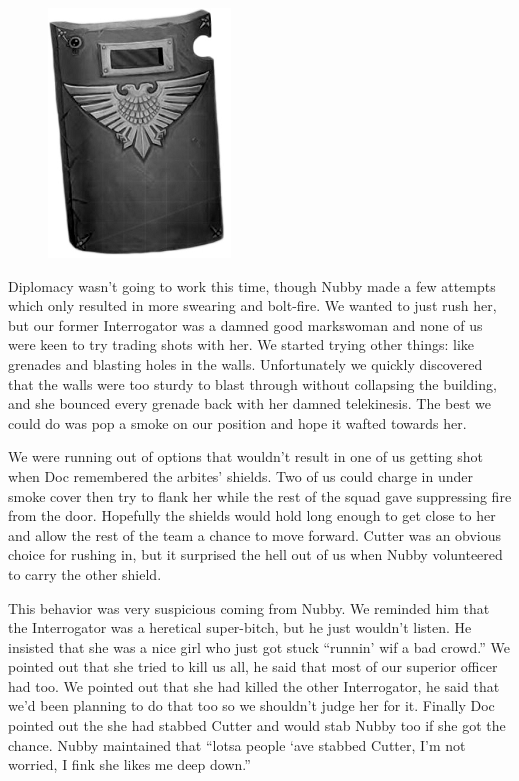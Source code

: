 \begin{figure}
	\begin{center}
		\includegraphics[width=\figwidth]{pics/5/35.png}
	\end{center}
\end{figure}
Diplomacy wasn’t going to work this time, though Nubby made a few attempts which only resulted in more swearing and bolt-fire. 
We wanted to just rush her, but our former Interrogator was a damned good markswoman and none of us were keen to try trading shots with her. 
We started trying other things: like grenades and blasting holes in the walls. 
Unfortunately we quickly discovered that the walls were too sturdy to blast through without collapsing the building, and she bounced every grenade back with her damned telekinesis. 
The best we could do was pop a smoke on our position and hope it wafted towards her.

We were running out of options that wouldn’t result in one of us getting shot when Doc remembered the arbites’ shields. 
Two of us could charge in under smoke cover then try to flank her while the rest of the squad gave suppressing fire from the door. 
Hopefully the shields would hold long enough to get close to her and allow the rest of the team a chance to move forward. 
Cutter was an obvious choice for rushing in, but it surprised the hell out of us when Nubby volunteered to carry the other shield.

This behavior was very suspicious coming from Nubby. We reminded him that the Interrogator was a heretical super-bitch, but he just wouldn’t listen. 
He insisted that she was a nice girl who just got stuck “runnin’ wif a bad crowd.” 
We pointed out that she tried to kill us all, he said that most of our superior officer had too. 
We pointed out that she had killed the other Interrogator, he said that we’d been planning to do that too so we shouldn’t judge her for it. 
Finally Doc pointed out the she had stabbed Cutter and would stab Nubby too if she got the chance. 
Nubby maintained that “lotsa people ‘ave stabbed Cutter, I’m not worried, I fink she likes me deep down.” 

